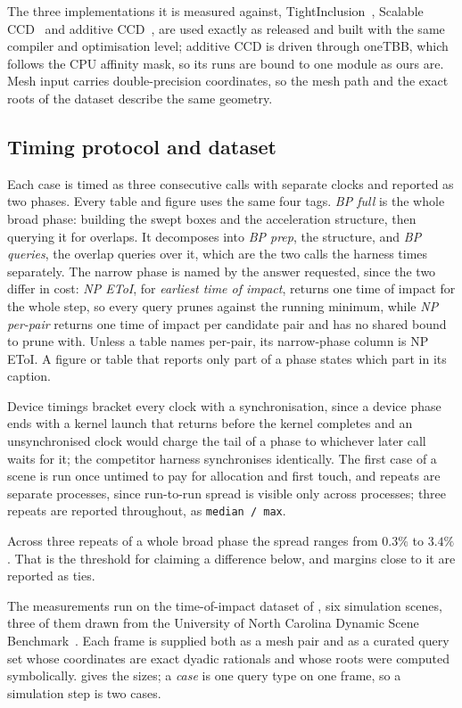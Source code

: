The three implementations it is measured against,
TightInclusion~\citep{wang2021tight}, Scalable CCD~\citep{belgrod2025toi} and
additive CCD~\citep{li2021codim}, are used exactly as released and built with
the same compiler and optimisation level; additive CCD is driven through oneTBB,
which follows the CPU affinity mask, so its runs are bound to one module as ours
are. Mesh input carries double-precision coordinates, so the mesh path and the
exact roots of the dataset describe the same geometry.

\subsection{Timing protocol and dataset}
\label{sec:results:protocol}

Each case is timed as three consecutive calls with separate clocks and reported
as two phases. Every table and figure uses the same four tags. \emph{BP full} is
the whole broad phase: building the swept boxes and the acceleration structure,
then querying it for overlaps. It decomposes into \emph{BP prep}, the structure,
and \emph{BP queries}, the overlap queries over it, which are the two calls the
harness times separately. The narrow phase is named by the answer requested,
since the two differ in cost: \emph{NP EToI}, for \emph{earliest time of
impact}, returns one time of impact for the whole step, so every query prunes
against the running minimum, while \emph{NP per-pair} returns one time of impact
per candidate pair and has no shared bound to prune with. Unless a table names
per-pair, its narrow-phase column is NP EToI. A figure or table that reports only
part of a phase states which part in its caption.

Device timings bracket every clock with a synchronisation, since a device phase
ends with a kernel launch that returns before the kernel completes and an
unsynchronised clock would charge the tail of a phase to whichever later call
waits for it; the competitor harness synchronises identically. The first case of
a scene is run once untimed to pay for allocation and first touch, and repeats
are separate processes, since run-to-run spread is visible only across
processes; three repeats are reported throughout, as \texttt{median / max}.

Across three repeats of a whole broad phase the spread ranges from $0.3\%$ to
$3.4\%$. That is the threshold for claiming a difference below, and margins close
to it are reported as ties.

The measurements run on the time-of-impact dataset of
\citet{belgrod2025toi,nyuccd}, six simulation scenes, three of them drawn from
the University of North Carolina Dynamic Scene Benchmark~\citep{curtis2012unc}.
Each frame is supplied both as a mesh pair and as a curated query set whose
coordinates are exact dyadic rationals and whose roots were computed
symbolically.  gives the sizes; a \emph{case} is one query
type on one frame, so a simulation step is two cases.


